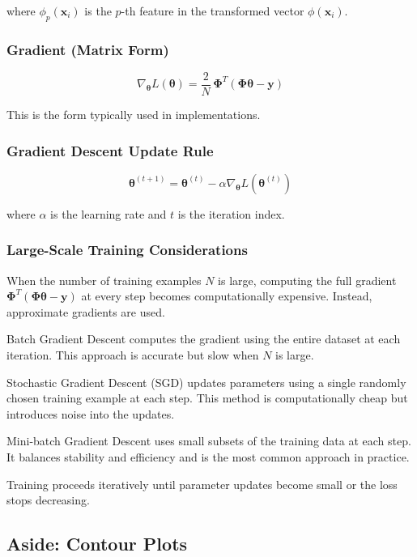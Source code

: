 \documentclass{article}
\begin{document}
where $\phi_p(\mathbf{x}_i)$ is the $p$-th feature in the transformed vector $\phi(\mathbf{x}_i)$.

\subsubsection*{Gradient (Matrix Form)}

\[
\nabla_{\boldsymbol{\theta}} L(\boldsymbol{\theta})
=
\frac{2}{N}\,\boldsymbol{\Phi}^T (\boldsymbol{\Phi}\boldsymbol{\theta} - \mathbf{y})
\]

This is the form typically used in implementations.

\subsubsection*{Gradient Descent Update Rule}

\[
\boldsymbol{\theta}^{(t+1)} 
= \boldsymbol{\theta}^{(t)} 
- \alpha \nabla_{\boldsymbol{\theta}} L(\boldsymbol{\theta}^{(t)})
\]

where $\alpha$ is the learning rate and $t$ is the iteration index.

\subsubsection*{Large-Scale Training Considerations}

When the number of training examples $N$ is large, computing the full gradient 
$\boldsymbol{\Phi}^T(\boldsymbol{\Phi}\boldsymbol{\theta} - \mathbf{y})$ at every step becomes computationally expensive. Instead, approximate gradients are used.

Batch Gradient Descent computes the gradient using the entire dataset at each iteration. This approach is accurate but slow when $N$ is large.

Stochastic Gradient Descent (SGD) updates parameters using a single randomly chosen training example at each step. This method is computationally cheap but introduces noise into the updates.

Mini-batch Gradient Descent uses small subsets of the training data at each step. It balances stability and efficiency and is the most common approach in practice.

Training proceeds iteratively until parameter updates become small or the loss stops decreasing.


\subsection{Aside: Contour Plots}
\end{document}
